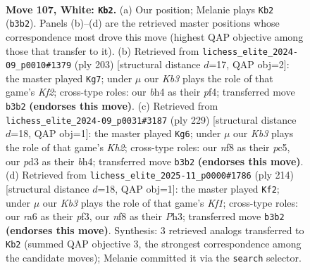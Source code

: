 \documentclass[11pt]{article}
\begin{document}
\clearpage

\begin{figure}[p]\centering
\begin{subfigure}{0.46\textwidth}\centering
\resizebox{\linewidth}{!}{%
\newchessgame
\chessboard[
  setfen={5n2/2R5/r6p/4p3/6kb/1K1p4/8/8 w - - 10 107},
  showmover=false,
  pgfstyle=straightmove, color=movearrow, markmove={b3-b2}
]}
\caption{}
\end{subfigure}\hfill
\begin{subfigure}{0.46\textwidth}\centering
\resizebox{\linewidth}{!}{%
\newchessgame
\chessboard[
  setfen={8/5k1P/1R6/8/5PK1/8/8/r7 b - - 0 102},
  showmover=false,
  pgfstyle=straightmove, color=movearrow, markmove={f7-g7}
]}
\caption{}
\end{subfigure}
\\[4pt]
\begin{subfigure}{0.46\textwidth}\centering
\resizebox{\linewidth}{!}{%
\newchessgame
\chessboard[
  setfen={5R2/7k/4r3/K1P4p/7B/6P1/6b1/8 b - - 46 115},
  showmover=false,
  pgfstyle=straightmove, color=movearrow, markmove={h7-g6}
]}
\caption{}
\end{subfigure}\hfill
\begin{subfigure}{0.46\textwidth}\centering
\resizebox{\linewidth}{!}{%
\newchessgame
\chessboard[
  setfen={8/1B6/3r2b1/8/5k1p/5p1P/8/5K2 w - - 0 108},
  showmover=false,
  pgfstyle=straightmove, color=movearrow, markmove={f1-f2}
]}
\caption{}
\end{subfigure}
\caption{\textbf{Move 107, White: \texttt{Kb2}.} (a) Our position; Melanie plays \texttt{Kb2} (\texttt{b3b2}). Panels (b)--(d) are the retrieved master positions whose correspondence most drove this move (highest QAP objective among those that transfer to it). (b) Retrieved from \texttt{lichess\_elite\_2024-09\_p0010\#1379} (ply 203) [structural distance $d$=17, QAP obj=2]: the master played \texttt{Kg7}; under $\mu$ our \emph{Kb3} plays the role of that game's \emph{Kf2}; cross-type roles: our \emph{b}h4 as their \emph{p}f4; transferred move \texttt{b3b2} \textbf{(endorses this move)}. (c) Retrieved from \texttt{lichess\_elite\_2024-09\_p0031\#3187} (ply 229) [structural distance $d$=18, QAP obj=1]: the master played \texttt{Kg6}; under $\mu$ our \emph{Kb3} plays the role of that game's \emph{Kh2}; cross-type roles: our \emph{n}f8 as their \emph{p}c5, our \emph{p}d3 as their \emph{b}h4; transferred move \texttt{b3b2} \textbf{(endorses this move)}. (d) Retrieved from \texttt{lichess\_elite\_2025-11\_p0000\#1786} (ply 214) [structural distance $d$=18, QAP obj=1]: the master played \texttt{Kf2}; under $\mu$ our \emph{Kb3} plays the role of that game's \emph{Kf1}; cross-type roles: our \emph{r}a6 as their \emph{p}f3, our \emph{n}f8 as their \emph{P}h3; transferred move \texttt{b3b2} \textbf{(endorses this move)}. Synthesis: 3 retrieved analogs transferred to \texttt{Kb2} (summed QAP objective 3, the strongest correspondence among the candidate moves); Melanie committed it via the \texttt{search} selector.}
\label{fig:thought-m212}
\end{figure}
\end{document}
